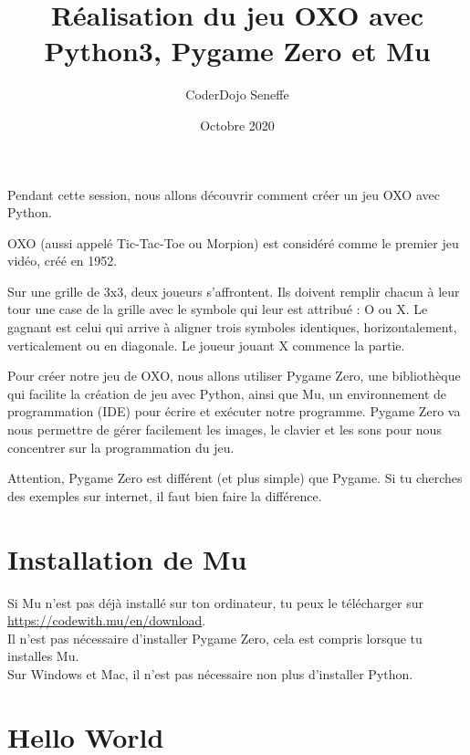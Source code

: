 \documentclass[11pt]{article}
\author{CoderDojo Seneffe}
\title{Réalisation du jeu OXO avec Python3, Pygame Zero et Mu}
\date{Octobre 2020}
\newcommand{\trad}[1]{\marginnote{\textcolor{deepblue}{#1}}}
\begin{document}
\maketitle

Pendant cette session,\trad{\RaggedRight Retrouve les traductions anglais~$\rightarrow$~français dans cette marge.}
nous allons découvrir comment créer un jeu OXO avec Python.

OXO (aussi appelé Tic-Tac-Toe ou Morpion) est considéré comme le premier jeu vidéo, créé en 1952.

Sur une grille de 3x3, deux joueurs s'affrontent. Ils doivent remplir chacun à leur tour une case de la grille avec le symbole qui leur est attribué : O ou X. Le gagnant est celui qui arrive à aligner trois symboles identiques, horizontalement, verticalement ou en diagonale. Le joueur jouant X commence la partie.

Pour créer notre jeu de OXO, nous allons utiliser Pygame Zero, une bibliothèque qui facilite la création de jeu avec Python,
ainsi que Mu, un environnement de programmation (IDE) pour écrire et exécuter notre programme.
Pygame Zero va nous permettre de gérer facilement les images, le clavier et les sons pour nous concentrer sur la programmation du jeu.

Attention, Pygame Zero est différent (et plus simple) que Pygame. Si tu cherches des exemples sur internet, il faut bien faire la différence.

\section{Installation de Mu}

Si Mu n'est pas déjà installé sur ton ordinateur, tu peux le télécharger sur \url{https://codewith.mu/en/download}.\\
Il n'est pas nécessaire d'installer Pygame Zero, cela est compris lorsque tu installes Mu.\\
Sur Windows et Mac, il n'est pas nécessaire non plus d'installer Python.

\section{Hello World}
\end{document}
